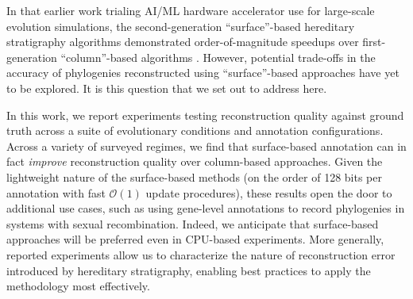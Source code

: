 In that earlier work trialing AI/ML hardware accelerator use for large-scale evolution simulations, the second-generation ``surface''-based hereditary stratigraphy algorithms demonstrated order-of-magnitude speedups over first-generation ``column''-based algorithms \citep{moreno2024trackable}.
However, potential trade-offs in the accuracy of phylogenies reconstructed using ``surface''-based approaches have yet to be explored.
It is this question that we set out to address here.

In this work, we report experiments testing reconstruction quality against ground truth across a suite of evolutionary conditions and annotation configurations.
Across a variety of surveyed regimes, we find that surface-based annotation can in fact \textit{improve} reconstruction quality over column-based approaches.
Given the lightweight nature of the surface-based methods (on the order of 128 bits per annotation with fast $\mathcal{O}(1)$ update procedures), these results open the door to additional use cases, such as using gene-level annotations to record phylogenies in systems with sexual recombination.
Indeed, we anticipate that surface-based approaches will be preferred even in CPU-based experiments.
More generally, reported experiments allow us to characterize the nature of reconstruction error introduced by hereditary stratigraphy, enabling best practices to apply the methodology most effectively.


